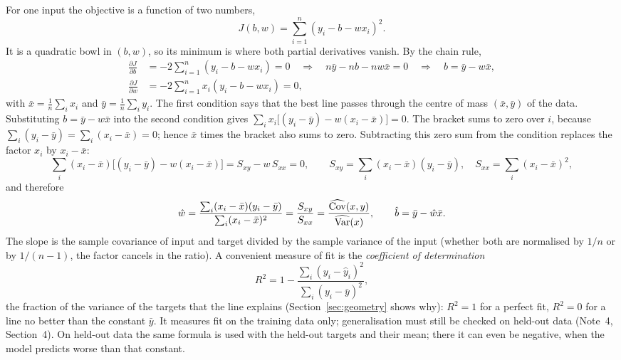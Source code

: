 \documentclass[11pt]{article}
\begin{document}
For one input the objective is a function of two numbers,
\[
  J(b, w) = \sum_{i=1}^n (y_i - b - w x_i)^2 .
\]
It is a quadratic bowl in $(b, w)$, so its minimum is where both partial derivatives vanish. By the chain rule,
\begin{align*}
  \frac{\partial J}{\partial b} &= -2 \sum_{i=1}^n (y_i - b - w x_i) = 0
    \quad\Longrightarrow\quad n\bar y - n b - n w \bar x = 0
    \quad\Longrightarrow\quad b = \bar y - w \bar x , \\
  \frac{\partial J}{\partial w} &= -2 \sum_{i=1}^n x_i (y_i - b - w x_i) = 0 ,
\end{align*}
with $\bar x = \frac1n\sum_i x_i$ and $\bar y = \frac1n\sum_i y_i$. The first condition says that the best line passes
through the centre of mass $(\bar x, \bar y)$ of the data. Substituting $b = \bar y - w\bar x$ into the second condition
gives $\sum_i x_i\big[(y_i - \bar y) - w(x_i - \bar x)\big] = 0$. The bracket sums to zero over $i$, because
$\sum_i (y_i - \bar y) = \sum_i (x_i - \bar x) = 0$; hence $\bar x$ times the bracket also sums to zero. Subtracting this
zero sum from the condition replaces the factor $x_i$ by $x_i - \bar x$:
\[
  \sum_i (x_i - \bar x)\big[(y_i - \bar y) - w(x_i - \bar x)\big] = S_{xy} - w\,S_{xx} = 0,
  \qquad S_{xy} = \sum_i (x_i - \bar x)(y_i - \bar y),\quad S_{xx} = \sum_i (x_i - \bar x)^2 ,
\]
and therefore
\begin{equation}\label{eq:slope}
  \hat w = \frac{\sum_i (x_i - \bar x)(y_i - \bar y)}{\sum_i (x_i - \bar x)^2} = \frac{S_{xy}}{S_{xx}}
         = \frac{\widehat{\operatorname{Cov}}(x, y)}{\widehat{\operatorname{Var}}(x)}, \qquad \hat b = \bar y - \hat w \bar x .
\end{equation}
The slope is the sample covariance of input and target divided by the sample variance of the input (whether both are
normalised by $1/n$ or by $1/(n-1)$, the factor cancels in the ratio). A convenient
measure of fit is the \emph{coefficient of determination}
\[
  R^2 = 1 - \frac{\sum_i (y_i - \hat y_i)^2}{\sum_i (y_i - \bar y)^2} ,
\]
the fraction of the variance of the targets that the line explains (Section~\ref{sec:geometry} shows why): $R^2 = 1$
for a perfect fit, $R^2 = 0$ for a line no better than the constant $\bar y$. It measures fit on the training data only;
generalisation must still be checked on held-out data (Note~4, Section~4). On held-out data the same formula is used
with the held-out targets and their mean; there it can even be negative, when the model predicts worse than that
constant.
\end{document}
